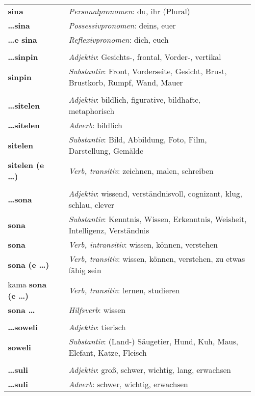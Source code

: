 \begin{supertabular}{p{2,5cm}|ll}
\textbf{sina} && \textit{Personalpronomen}: du, ihr (Plural)  \\ 
\textbf{\dots sina} && \textit{Possessivpronomen}: deins, euer  \\  
\textbf{\dots e sina} && \textit{Reflexivpronomen}: dich, euch  \\  
 && \\ %
\textbf{\dots sinpin} && \textit{Adjektiv}: Gesichts-, frontal, Vorder-, vertikal \\ 
\textbf{sinpin} && \textit{Substantiv}: Front, Vorderseite, Gesicht, Brust, Brustkorb, Rumpf, Wand, Mauer \\ 
 && \\ %
\textbf{\dots sitelen} && \textit{Adjektiv}: bildlich, figurative, bildhafte, metaphorisch \\ 
\textbf{\dots sitelen} && \textit{Adverb}: bildlich \\ 
\textbf{sitelen} && \textit{Substantiv}: Bild, Abbildung, Foto, Film, Darstellung, Gemälde \\ 
\textbf{sitelen (e \dots)} && \textit{Verb, transitiv}: zeichnen, malen, schreiben \\ 
 && \\ %
\textbf{\dots sona} && \textit{Adjektiv}: wissend, verständnisvoll, cognizant, klug, schlau, clever \\ 
\textbf{sona} && \textit{Substantiv}: Kenntnis, Wissen, Erkenntnis, Weisheit, Intelligenz, Verständnis \\ 
\textbf{sona} && \textit{Verb, intransitiv}: wissen, können, verstehen \\ 
\textbf{sona (e \dots)} && \textit{Verb, transitiv}: wissen, können, verstehen, zu etwas fähig sein \\ 
kama \textbf{sona (e \dots)} && \textit{Verb, transitiv}: lernen, studieren \\ 
\textbf{sona \dots} && \textit{Hilfsverb}: wissen \\ 
 && \\ %
\textbf{\dots soweli} && \textit{Adjektiv}: tierisch \\ 
\textbf{soweli} && \textit{Substantiv}: (Land-) Säugetier, Hund, Kuh, Maus, Elefant, Katze, Fleisch \\ 
 && \\ %
\textbf{\dots suli} && \textit{Adjektiv}: groß, schwer, wichtig, lang, erwachsen \\ 
\textbf{\dots suli} && \textit{Adverb}: schwer, wichtig, erwachsen \\ 

\end{supertabular}

